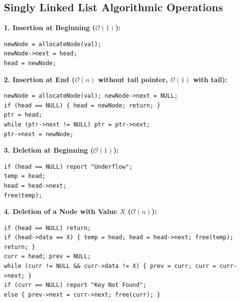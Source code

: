 \documentclass[12pt,a4paper]{article}
\begin{document}
\begin{tcolorbox}[tikzbox, title={\textbf{Memory Representation and Pointer Rewiring in a Singly Linked List}}]
\centering
{}
\end{tcolorbox}

\subsection{Singly Linked List Algorithmic Operations}
\begin{tcolorbox}[formulabox, title={\textbf{Algorithms for Insertion and Deletion in SLL}}]
\textbf{1. Insertion at Beginning ($\mathcal{O}(1)$):}
\begin{verbatim}
newNode = allocateNode(val);
newNode->next = head;
head = newNode;
\end{verbatim}

\textbf{2. Insertion at End ($\mathcal{O}(n)$ without tail pointer, $\mathcal{O}(1)$ with tail):}
\begin{verbatim}
newNode = allocateNode(val); newNode->next = NULL;
if (head == NULL) { head = newNode; return; }
ptr = head;
while (ptr->next != NULL) ptr = ptr->next;
ptr->next = newNode;
\end{verbatim}

\textbf{3. Deletion at Beginning ($\mathcal{O}(1)$):}
\begin{verbatim}
if (head == NULL) report "Underflow";
temp = head;
head = head->next;
free(temp);
\end{verbatim}

\textbf{4. Deletion of a Node with Value $X$ ($\mathcal{O}(n)$):}
\begin{verbatim}
if (head == NULL) return;
if (head->data == X) { temp = head; head = head->next; free(temp); return; }
curr = head; prev = NULL;
while (curr != NULL && curr->data != X) { prev = curr; curr = curr->next; }
if (curr == NULL) report "Key Not Found";
else { prev->next = curr->next; free(curr); }
\end{verbatim}
\end{tcolorbox}
\end{document}
